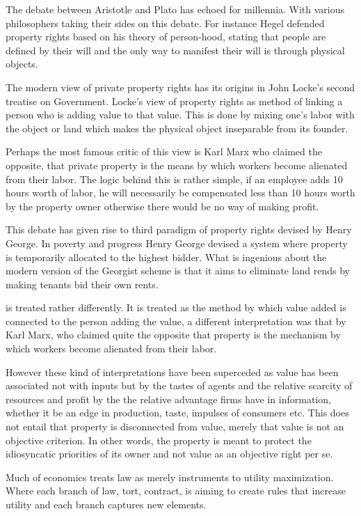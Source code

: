 \documentclass[12pt]{article}
\numberwithin{equation}{section}
\begin{document}
The debate between Aristotle and Plato has echoed for millennia. With various philosophers taking their sides on this debate. For instance Hegel defended property rights based on his theory of person-hood, stating that people are defined by their will and the only way to manifest their will is through physical objects. 

The modern view of private property rights has its origins in John Locke's second treatise on Government. Locke's view of property rights as method of linking a person who is adding value to that value. This is done by mixing one's labor with the object or land which makes the physical object inseparable from its founder. 

Perhaps the most famous critic of this view is Karl Marx who claimed the opposite, that private property is the means by which workers become alienated from their labor. The logic behind this is rather simple, if an employee adds 10 hours worth of labor, he will necessarily be compensated less than 10 hours worth by the property owner otherwise there would be no way of making profit. 

This debate has given rise to third paradigm of property rights devised by Henry George. In poverty and progress Henry George devised a system where property is temporarily allocated to the highest bidder. What is ingenious about the modern version of the Georgist scheme is that it aims to eliminate land rends by making tenants bid their own rents. 


is treated rather differently. It is treated as the method by which value added is connected to the person adding the value, a different interpretation was that by Karl Marx, who claimed quite the opposite that property is the mechanism by which workers become alienated from their labor. 

However these kind of interpretations have been superceded as value has been associated not with inputs but by the tastes of agents and the relative scarcity of resources and profit by the the relative advantage firms have in information, whether it be an edge in production, taste, impulses of consumers etc. This does not entail that property is disconnected from value, merely that value is not an objective criterion. In other words, the property is meant to protect the idiosyncatic priorities of its owner and not value as an objective right per se. 

Much of economics treats law as merely instruments to utility maximization. Where each branch of law, tort, contract, is aiming to create rules that increase utility and each branch captures new elements. 
\end{document}

